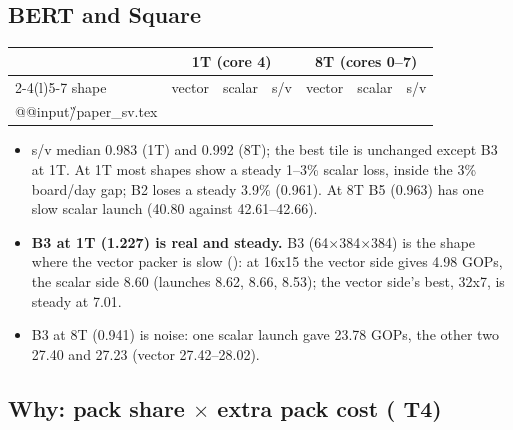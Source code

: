 \subsection{BERT and Square}\label{sec:paperpack}
\begin{center}\small
\begin{tabular}{@{}l llr llr@{}}
\toprule
 & \multicolumn{3}{c}{1T (core 4)} & \multicolumn{3}{c}{8T (cores 0--7)} \\
\cmidrule(lr){2-4}\cmidrule(l){5-7}
shape & vector & scalar & s/v & vector & scalar & s/v \\
\midrule
\csname @@input\endcsname \G/paper_sv.tex
\bottomrule
\end{tabular}
\end{center}
\begin{itemize}\setlength\itemsep{1pt}
\item s/v median 0.983 (1T) and 0.992 (8T); the best tile is unchanged except B3 at 1T. At 1T most shapes show a steady 1--3\% scalar loss, inside the 3\% board/day gap; B2 loses a steady 3.9\% (0.961). At 8T B5 (0.963) has one slow scalar launch (40.80 against 42.61--42.66).
\item \textbf{B3 at 1T (1.227) is real and steady.} B3 (64$\times$384$\times$384) is the shape where the vector packer is slow (): at 16x15 the vector side gives 4.98 GOPs, the scalar side 8.60 (launches 8.62, 8.66, 8.53); the vector side's best, 32x7, is steady at 7.01.
\item B3 at 8T (0.941) is noise: one scalar launch gave 23.78 GOPs, the other two 27.40 and 27.23 (vector 27.42--28.02).
\end{itemize}

\subsection{Why: pack share $\times$ extra pack cost ( T4)}


